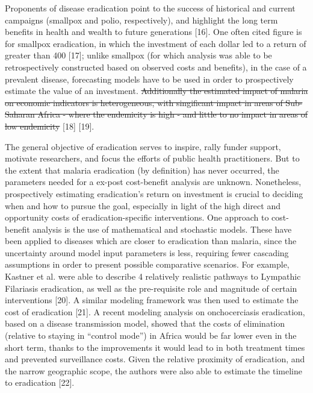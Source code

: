 \documentclass[]{article}
\begin{document}
Proponents of disease eradication point to the success of historical and
current campaigns (smallpox and polio, respectively), and highlight the
long term benefits in health and wealth to future generations {[}16{]}.
One often cited figure is for smallpox eradication, in which the
investment of each dollar led to a return of greater than 400 {[}17{]};
unlike smallpox (for which analysis was able to be retrospectively
constructed based on observed costs and benefits), in the case of a
prevalent disease, forecasting models have to be used in order to
prospectively estimate the value of an investment.
\st{Additionally the estimated impact of malaria on economic indicators is heterogeneous, with singificant impact in areas of Sub-Saharan Africa - where the endemicity is high - and little to no impact in areas of low endemicity}
{[}18{]} {[}19{]}.

The general objective of eradication serves to inspire, rally funder
support, motivate researchers, and focus the efforts of public health
practitioners. But to the extent that malaria eradication (by
definition) has never occurred, the parameters needed for a ex-post
cost-benefit analysis are unknown. Nonetheless, prospectively estimating
eradication's return on investment is crucial to deciding when and how
to pursue the goal, especially in light of the high direct and
opportunity costs of eradication-specific interventions. One approach to
cost-benefit analysis is the use of mathematical and stochastic models.
These have been applied to diseases which are closer to eradication than
malaria, since the uncertainty around model input parameters is less,
requiring fewer cascading assumptions in order to present possible
comparative scenarios. For example, Kastner et al. were able to describe
4 relatively realistic pathways to Lympathic Filariasis eradication, as
well as the pre-requisite role and magnitude of certain interventions
{[}20{]}. A similar modeling framework was then used to estimate the
cost of eradication {[}21{]}. A recent modeling analysis on
onchocerciasis eradication, based on a disease transmission model,
showed that the costs of elimination (relative to staying in ``control
mode'') in Africa would be far lower even in the short term, thanks to
the improvements it would lead to in both treatment times and prevented
surveillance costs. Given the relative proximity of eradication, and the
narrow geographic scope, the authors were also able to estimate the
timeline to eradication {[}22{]}.
\end{document}
